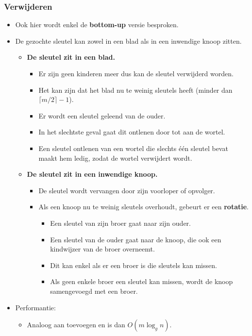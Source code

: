 \subsubsection{Verwijderen}
\begin{itemize}
    \item Ook hier wordt enkel de \textbf{bottom-up} versie besproken.
    \item De gezochte sleutel kan zowel in een blad als in een inwendige knoop zitten.
    \begin{itemize}
        \item \textbf{De sleutel zit in een blad.}
        \begin{itemize}
            \item Er zijn geen kinderen meer dus kan de sleutel verwijderd worden.
            \item Het kan zijn dat het blad nu te weinig sleutels heeft (minder dan $\lceil m/2 \rceil - 1$).
            \item Er wordt een sleutel geleend van de ouder.
            \item In het slechtste geval gaat dit ontlenen door tot aan de wortel.
            \item Een sleutel ontlenen van een wortel die slechts één sleutel bevat maakt hem ledig, zodat de wortel verwijdert wordt.
        \end{itemize}
        \item \textbf{De sleutel zit in een inwendige knoop.}
        \begin{itemize}
            \item De sleutel wordt vervangen door zijn voorloper of opvolger.
            \item Als een knoop nu te weinig sleutels overhoudt, gebeurt er een \textbf{rotatie}.
            \begin{itemize}
                \item Een sleutel van zijn broer gaat naar zijn ouder.
                \item Een sleutel van de ouder gaat naar de knoop, die ook een kindwijzer van de broer overneemt.
                \item Dit kan enkel als er een broer is die sleutels kan missen.
                \item Als geen enkele broer een sleutel kan missen, wordt de knoop samengevoegd met een broer.
            \end{itemize}
        \end{itemize}
    \end{itemize}
    \item Performantie:
    \begin{itemize}
        \item Analoog aan toevoegen en is dan $O(m\log_g n)$.
    \end{itemize}
\end{itemize}
